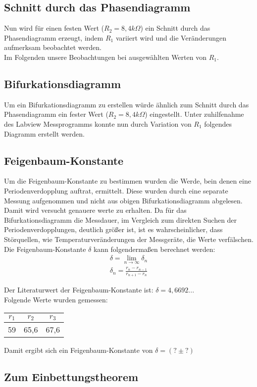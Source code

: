 \newpage
\subsection{Schnitt durch das Phasendiagramm}
Nun wird für einen festen Wert (\(R_2 = 8,4 k\Omega\)) ein Schnitt durch das Phasendiagramm erzeugt, indem \(R_1\) variiert wird und die Veränderungen aufmerksam beobachtet werden. \\
Im Folgenden unsere Beobachtungen bei ausgewählten Werten von \(R_1\).

\subsection{Bifurkationsdiagramm}
Um ein Bifurkationsdiagramm zu erstellen würde ähnlich zum Schnitt durch das Phasendiagramm ein fester Wert (\(R_2=8,4k \Omega\)) eingestellt. Unter zuhilfenahme des Labview Messprogramms konnte nun durch Variation von \(R_1\) folgendes Diagramm erstellt werden.



\subsection{Feigenbaum-Konstante}

Um die Feigenbaum-Konstante zu bestimmen wurden die Werde, bein denen eine Periodenverdopplung auftrat, ermittelt. Diese wurden durch eine separate Messung aufgenommen und nicht aus obigen Bifurkationsdiagramm abgelesen. Damit wird versucht genauere werte zu erhalten. Da für das Bifurkationsdiagramm die Messdauer, im Vergleich zum direkten Suchen der Periodenverdopplungen, deutlich größer ist, ist es wahrscheinlicher, dass Störquellen, wie Temperaturveränderungen der Messgeräte, die Werte verfälschen.\\

Die Feigenbaum-Konstante \(\delta\) kann folgendermaßen berechnet werden: 
\begin{align}
    \delta = \lim_{n \to \infty} \delta_n \\
    \delta_n = \frac{r_n - r_{n-1}}{r_{n+1} -r_n}
\end{align}

Der Literaturwert der Feigenbaum-Konstante ist: \(\delta = 4,6692...\)\\

Folgende Werte wurden gemessen: \\
\begin{tabular}{c c c}
    $r_1$ & $r_2$ & $r_3$\\
    \hline
    59 & 65,6 & 67,6
\end{tabular}

Damit ergibt sich ein Feigenbaum-Konstante von \(\delta = (? \pm ?)\)

\subsection{Zum Einbettungstheorem}